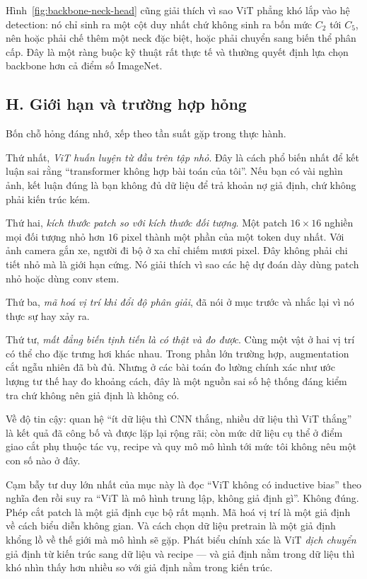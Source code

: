 \documentclass[../../../deep_learning.tex]{subfiles}
\begin{document}
Hình~\ref{fig:backbone-neck-head} cũng giải thích vì sao ViT phẳng khó lắp vào hệ detection: nó chỉ sinh ra một cột duy nhất chứ không sinh ra bốn mức \(C_2\) tới \(C_5\), nên hoặc phải chế thêm một neck đặc biệt, hoặc phải chuyển sang biến thể phân cấp. Đây là một ràng buộc kỹ thuật rất thực tế và thường quyết định lựa chọn backbone hơn cả điểm số ImageNet.

\subsection{H. Giới hạn và trường hợp hỏng}
Bốn chỗ hỏng đáng nhớ, xếp theo tần suất gặp trong thực hành.

Thứ nhất, \emph{ViT huấn luyện từ đầu trên tập nhỏ}. Đây là cách phổ biến nhất để kết luận sai rằng ``transformer không hợp bài toán của tôi''. Nếu bạn có vài nghìn ảnh, kết luận đúng là bạn không đủ dữ liệu để trả khoản nợ giả định, chứ không phải kiến trúc kém.

Thứ hai, \emph{kích thước patch so với kích thước đối tượng}. Một patch \(16\times16\) nghiền mọi đối tượng nhỏ hơn \(16\) pixel thành một phần của một token duy nhất. Với ảnh camera gắn xe, người đi bộ ở xa chỉ chiếm mươi pixel. Đây không phải chi tiết nhỏ mà là giới hạn cứng. Nó giải thích vì sao các hệ dự đoán dày dùng patch nhỏ hoặc dùng conv stem.

Thứ ba, \emph{mã hoá vị trí khi đổi độ phân giải}, đã nói ở mục trước và nhắc lại vì nó thực sự hay xảy ra.

Thứ tư, \emph{mất đẳng biến tịnh tiến là có thật và đo được}. Cùng một vật ở hai vị trí có thể cho đặc trưng hơi khác nhau. Trong phần lớn trường hợp, augmentation cắt ngẫu nhiên đã bù đủ. Nhưng ở các bài toán đo lường chính xác như ước lượng tư thế hay đo khoảng cách, đây là một nguồn sai số hệ thống đáng kiểm tra chứ không nên giả định là không có.

Về độ tin cậy: quan hệ ``ít dữ liệu thì CNN thắng, nhiều dữ liệu thì ViT thắng'' là kết quả đã công bố và được lặp lại rộng rãi; còn mức dữ liệu cụ thể ở điểm giao cắt phụ thuộc tác vụ, recipe và quy mô mô hình tới mức tôi không nêu một con số nào ở đây.

\begin{cambay}
Cạm bẫy tư duy lớn nhất của mục này là đọc ``ViT không có inductive bias'' theo nghĩa đen rồi suy ra ``ViT là mô hình trung lập, không giả định gì''. Không đúng. Phép cắt patch là một giả định cục bộ rất mạnh. Mã hoá vị trí là một giả định về cách biểu diễn không gian. Và cách chọn dữ liệu pretrain là một giả định khổng lồ về thế giới mà mô hình sẽ gặp. Phát biểu chính xác là ViT \emph{dịch chuyển} giả định từ kiến trúc sang dữ liệu và recipe --- và giả định nằm trong dữ liệu thì khó nhìn thấy hơn nhiều so với giả định nằm trong kiến trúc.
\end{cambay}
\end{document}
